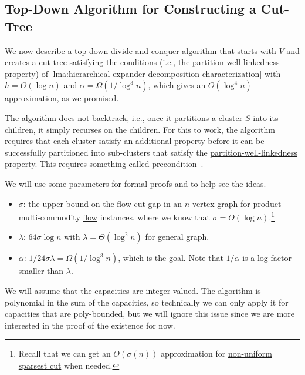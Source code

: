 \subsection{Top-Down Algorithm for Constructing a Cut-Tree}
We now describe a top-down divide-and-conquer algorithm that starts with \(V\) and creates a \hyperref[def:cut-tree]{cut-tree} satisfying the conditions (i.e., the \hyperref[def:partition-and-boundary-well-linked]{partition-well-linkedness} property) of \autoref{lma:hierarchical-expander-decomposition-characterization} with \(h = O(\log n)\) and \(\alpha = \Omega (1 / \log ^3 n)\), which gives an \(O(\log ^4 n)\)-approximation, as we promised.

The algorithm does not backtrack, i.e., once it partitions a cluster \(S\) into its children, it simply recurses on the children. For this to work, the algorithm requires that each cluster satisfy an additional property before it can be successfully partitioned into sub-clusters that satisfy the \hyperref[def:partition-and-boundary-well-linked]{partition-well-linkedness} property. This requires something called \hyperref[def:precondition]{precondition}~\cite{bienkowski2003practical}.

\begin{notation}[Parameter]
	We will use some parameters for formal proofs and to help see the ideas.
	\begin{itemize}
		\item \(\sigma \): the upper bound on the flow-cut gap in an \(n\)-vertex graph for product multi-commodity \hyperref[def:flow]{flow} instances, where we know that \(\sigma = O(\log n)\).\footnote{Recall that we can get an \(O(\sigma (n))\) approximation for \hyperref[prb:non-uniform-sparsest-cut]{non-uniform sparsest cut} when needed.}
		\item \(\lambda \): \(64 \sigma \log n\) with \(\lambda = \Theta (\log ^2 n)\) for general graph.
		\item \(\alpha \): \(1 / 24 \sigma \lambda = \Omega (1 / \log ^3 n)\), which is the goal. Note that \(1 / \alpha \) is a log factor smaller than \(\lambda \).
	\end{itemize}
\end{notation}

We will assume that the capacities are integer valued. The algorithm is polynomial in the sum of the capacities, so technically we can only apply it for capacities that are poly-bounded, but we will ignore this issue since we are more interested in the proof of the existence for now.

